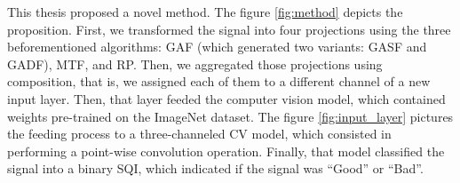 











This thesis proposed a novel method. The figure \ref{fig:method} depicts the proposition. First, we transformed the signal into four projections using the three beforementioned algorithms: \gls{GAF} (which generated two variants: \gls{GASF} and \gls{GADF}), \gls{MTF}, and \gls{RP}. Then, we aggregated those projections using composition, that is, we assigned each of them to a different channel of a new input layer. Then, that layer feeded the computer vision model, which contained weights pre-trained on the ImageNet dataset. The figure \ref{fig:input_layer} pictures the feeding process to a three-channeled \gls{CV} model, which consisted in performing a point-wise convolution operation. Finally, that model classified the signal into a binary \gls{SQI}, which indicated if the signal was ``Good'' or ``Bad''. 





